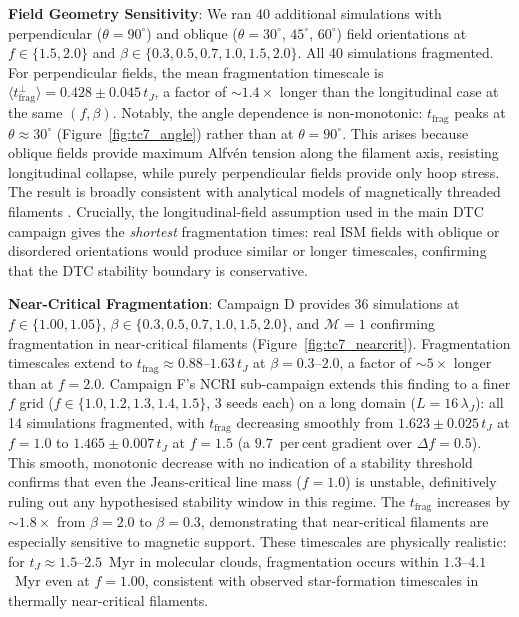 \documentclass[usenatbib]{rasti}
\begin{document}
\textbf{Field Geometry Sensitivity}: We ran 40 additional simulations with perpendicular
($\theta = 90^\circ$) and oblique ($\theta = 30^\circ$, $45^\circ$, $60^\circ$) field
orientations at $f \in \{1.5, 2.0\}$ and $\beta \in \{0.3, 0.5, 0.7, 1.0, 1.5, 2.0\}$.
All 40 simulations fragmented. For perpendicular fields, the mean fragmentation timescale
is $\langle t_\mathrm{frag}^\perp \rangle = 0.428 \pm 0.045\,t_J$, a factor of
$\sim 1.4\times$ longer than the longitudinal case at the same $(f,\beta)$. Notably, the
angle dependence is non-monotonic: $t_\mathrm{frag}$ peaks at $\theta \approx 30^\circ$
(Figure~\ref{fig:tc7_angle}) rather than at $\theta = 90^\circ$. This arises because
oblique fields provide maximum Alfv\'{e}n tension along the filament axis, resisting
longitudinal collapse, while purely perpendicular fields provide only hoop stress. The
result is broadly consistent with analytical models of magnetically threaded filaments
\citep{nagasawa1987,tomisaka2014}. Crucially, the longitudinal-field assumption used
in the main DTC campaign gives the \emph{shortest} fragmentation times: real ISM fields
with oblique or disordered orientations would produce similar or longer timescales,
confirming that the DTC stability boundary is conservative.

\textbf{Near-Critical Fragmentation}: Campaign D provides 36 simulations at
$f \in \{1.00, 1.05\}$, $\beta \in \{0.3, 0.5, 0.7, 1.0, 1.5, 2.0\}$, and $\mathcal{M} = 1$
confirming fragmentation in near-critical filaments (Figure~\ref{fig:tc7_nearcrit}).
Fragmentation timescales extend to $t_\mathrm{frag} \approx 0.88$--$1.63\,t_J$ at
$\beta = 0.3$--$2.0$, a factor of $\sim 5\times$ longer than at $f = 2.0$. Campaign F's
NCRI sub-campaign extends this finding to a finer $f$ grid ($f \in \{1.0, 1.2, 1.3, 1.4,
1.5\}$, 3 seeds each) on a long domain ($L = 16\,\lambda_J$): all 14 simulations fragmented,
with $t_\mathrm{frag}$ decreasing smoothly from $1.623 \pm 0.025\,t_J$ at $f = 1.0$ to
$1.465 \pm 0.007\,t_J$ at $f = 1.5$ (a $9.7$~per\,cent gradient over $\Delta f = 0.5$).
This smooth, monotonic decrease with no indication of a stability threshold confirms
that even the Jeans-critical line mass ($f = 1.0$) is unstable, definitively ruling out any
hypothesised stability window in this regime. The $t_\mathrm{frag}$ increases by
$\sim 1.8\times$ from $\beta = 2.0$ to $\beta = 0.3$, demonstrating that near-critical
filaments are especially sensitive to magnetic support. These timescales are physically
realistic: for $t_J \approx 1.5$--$2.5$~Myr in molecular clouds, fragmentation occurs
within $1.3$--$4.1$~Myr even at $f = 1.00$, consistent with observed star-formation
timescales in thermally near-critical filaments.
\end{document}
